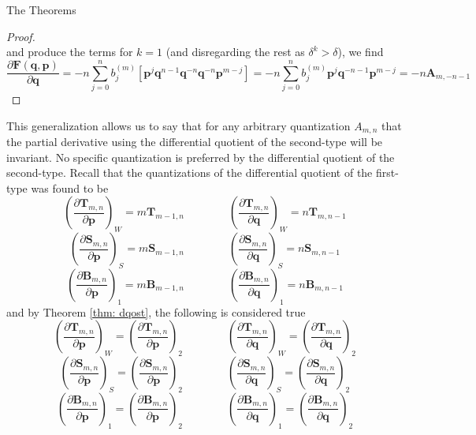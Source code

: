 \documentclass[aspectratio=169]{beamer}
\begin{document}
\begin{frame}[allowframebreaks]{The Theorems}
\begin{proof}
\begin{equation}
			\end{equation}
			and produce the terms for $k=1$ (and disregarding the rest as $\delta^k>\delta$), we find
			\begin{equation}
				\frac{\partial \textbf{F}(\textbf{q},\textbf{p})}{\partial \textbf{q}}=-n\sum_{j=0}^nb_j^{(m)}\left[\textbf{p}^j\textbf{q}^{n-1}\textbf{q}^{-n}\textbf{q}^{-n}\textbf{p}^{m-j}\right]=-n\sum_{j=0}^nb_j^{(m)}\textbf{p}^j\textbf{q}^{-n-1}\textbf{p}^{m-j}=-n\textbf{A}_{m,-n-1}
			\end{equation}
		\end{proof}
		
		This generalization allows us to say that for any arbitrary quantization $A_{m,n}$ that the partial derivative using the differential quotient of the second-type will be invariant. No specific quantization is preferred by the differential quotient of the second-type. Recall that the quantizations of the differential quotient of the first-type was found to be
		\begin{equation}
			\left(\frac{\partial \textbf{T}_{m,n}}{\partial\textbf{p}}\right)_W=m\textbf{T}_{m-1,n}\qquad\qquad\left(\frac{\partial\textbf{T}_{m,n}}{\partial\textbf{q}}\right)_W=n\textbf{T}_{m,n-1}
		\end{equation}
		\begin{equation}
			\left(\frac{\partial \textbf{S}_{m,n}}{\partial\textbf{p}}\right)_S=m\textbf{S}_{m-1,n}\qquad\qquad\left(\frac{\partial\textbf{S}_{m,n}}{\partial\textbf{q}}\right)_S=n\textbf{S}_{m,n-1}
		\end{equation}
		\begin{equation}
			\left(\frac{\partial \textbf{B}_{m,n}}{\partial\textbf{p}}\right)_1=m\textbf{B}_{m-1,n}\qquad\qquad\left(\frac{\partial\textbf{B}_{m,n}}{\partial\textbf{q}}\right)_1=n\textbf{B}_{m,n-1}
		\end{equation}
		and by Theorem \ref{thm: dqost}, the following is considered true
		\begin{equation}
			\left(\frac{\partial\textbf{T}_{m,n}}{\partial\textbf{p}}\right)_W=\left(\frac{\partial\textbf{T}_{m,n}}{\partial\textbf{p}}\right)_2\qquad\qquad\left(\frac{\partial\textbf{T}_{m,n}}{\partial\textbf{q}}\right)_W=\left(\frac{\partial\textbf{T}_{m,n}}{\partial\textbf{q}}\right)_2
		\end{equation}
		\begin{equation}
			\left(\frac{\partial\textbf{S}_{m,n}}{\partial\textbf{p}}\right)_S=\left(\frac{\partial\textbf{S}_{m,n}}{\partial\textbf{p}}\right)_2\qquad\qquad\left(\frac{\partial\textbf{S}_{m,n}}{\partial\textbf{q}}\right)_S=\left(\frac{\partial\textbf{S}_{m,n}}{\partial\textbf{q}}\right)_2
		\end{equation}
		\begin{equation}
			\left(\frac{\partial\textbf{B}_{m,n}}{\partial\textbf{p}}\right)_1=\left(\frac{\partial\textbf{B}_{m,n}}{\partial\textbf{p}}\right)_2\qquad\qquad\left(\frac{\partial\textbf{B}_{m,n}}{\partial\textbf{q}}\right)_1=\left(\frac{\partial\textbf{B}_{m,n}}{\partial\textbf{q}}\right)_2
		\end{equation}
		

\end{frame}
\end{document}
